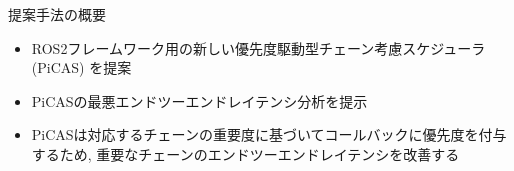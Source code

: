 
\begin{frame}{提案手法の概要}
    \begin{itemize}
        \item ROS2フレームワーク用の新しい優先度駆動型チェーン考慮スケジューラ (PiCAS) を提案
        \item PiCASの最悪エンドツーエンドレイテンシ分析を提示
        \item PiCASは対応するチェーンの重要度に基づいてコールバックに優先度を付与するため, 重要なチェーンのエンドツーエンドレイテンシを改善する
    \end{itemize}
\end{frame}
